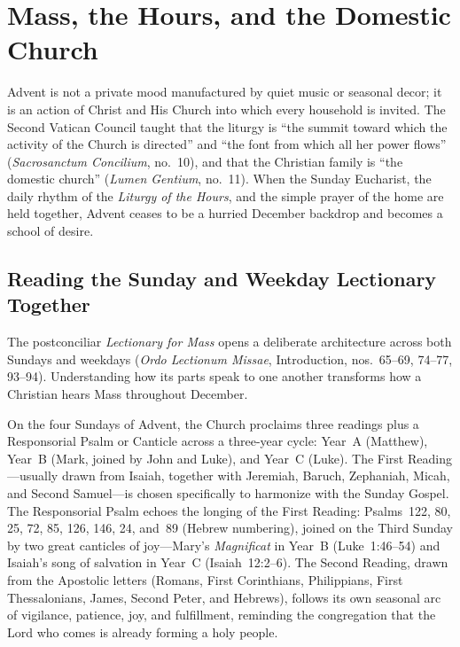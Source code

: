 \section{Mass, the Hours, and the Domestic Church}\label{sec:mass-hours-home}

Advent is not a private mood manufactured by quiet music or seasonal decor; it is an action of Christ and His Church into which every household is invited. The Second Vatican Council taught that the liturgy is ``the summit toward which the activity of the Church is directed'' and ``the font from which all her power flows'' (\textit{Sacrosanctum Concilium}, no.~10), and that the Christian family is ``the domestic church'' (\textit{Lumen Gentium}, no.~11). When the Sunday Eucharist, the daily rhythm of the \textit{Liturgy of the Hours}, and the simple prayer of the home are held together, Advent ceases to be a hurried December backdrop and becomes a school of desire.

\subsection{Reading the Sunday and Weekday Lectionary Together}

The postconciliar \textit{Lectionary for Mass} opens a deliberate architecture across both Sundays and weekdays (\textit{Ordo Lectionum Missae}, Introduction, nos.~65--69, 74--77, 93--94). Understanding how its parts speak to one another transforms how a Christian hears Mass throughout December.

On the four Sundays of Advent, the Church proclaims three readings plus a Responsorial Psalm or Canticle across a three-year cycle: Year~A (Matthew), Year~B (Mark, joined by John and Luke), and Year~C (Luke). The First Reading---usually drawn from Isaiah, together with Jeremiah, Baruch, Zephaniah, Micah, and Second Samuel---is chosen specifically to harmonize with the Sunday Gospel. The Responsorial Psalm echoes the longing of the First Reading: Psalms~122, 80, 25, 72, 85, 126, 146, 24, and~89 (Hebrew numbering), joined on the Third Sunday by two great canticles of joy---Mary's \textit{Magnificat} in Year~B (Luke~1:46--54) and Isaiah's song of salvation in Year~C (Isaiah~12:2--6). The Second Reading, drawn from the Apostolic letters (Romans, First Corinthians, Philippians, First Thessalonians, James, Second Peter, and Hebrews), follows its own seasonal arc of vigilance, patience, joy, and fulfillment, reminding the congregation that the Lord who comes is already forming a holy people.

